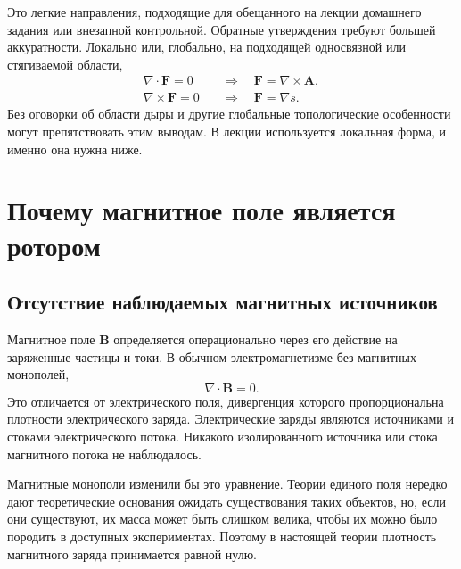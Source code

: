 Это легкие направления, подходящие для обещанного на лекции домашнего задания или внезапной контрольной. Обратные утверждения требуют большей аккуратности. Локально или, глобально, на подходящей односвязной или стягиваемой области,
\begin{align}
  \nabla\cdot\mathbf F=0
  &\quad\Longrightarrow\quad
  \mathbf F=\nabla\times\mathbf A,\\
  \nabla\times\mathbf F=0
  &\quad\Longrightarrow\quad
  \mathbf F=\nabla s.
\end{align}
Без оговорки об области дыры и другие глобальные топологические особенности могут препятствовать этим выводам. В лекции используется локальная форма, и именно она нужна ниже.

\section{Почему магнитное поле является ротором}

\subsection{Отсутствие наблюдаемых магнитных источников}

Магнитное поле \(\mathbf B\) определяется операционально через его действие на заряженные частицы и токи. В обычном электромагнетизме без магнитных монополей,
\begin{equation}
  \nabla\cdot\mathbf B=0.
\end{equation}
Это отличается от электрического поля, дивергенция которого пропорциональна плотности электрического заряда. Электрические заряды являются источниками и стоками электрического потока. Никакого изолированного источника или стока магнитного потока не наблюдалось.

Магнитные монополи изменили бы это уравнение. Теории единого поля нередко дают теоретические основания ожидать существования таких объектов, но, если они существуют, их масса может быть слишком велика, чтобы их можно было породить в доступных экспериментах. Поэтому в настоящей теории плотность магнитного заряда принимается равной нулю.

\begin{classroomqa}
\end{classroomqa}

